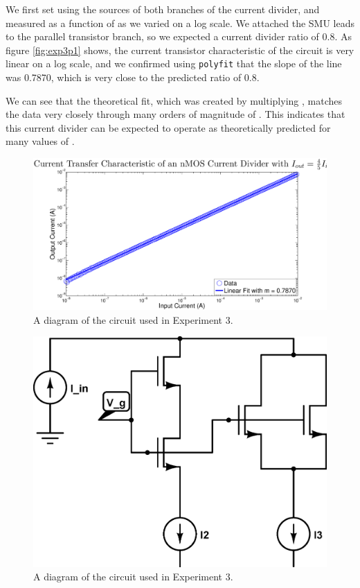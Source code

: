 We first set \Iin using the sources of both branches of the current divider, and measured \Iout as a function of \Iin as we varied \Iin on a log scale. We attached the SMU leads to the parallel transistor branch, so we expected a current divider ratio of 0.8. As figure \ref{fig:exp3p1} shows, the current transistor characteristic of the circuit is very linear on a log scale, and we confirmed using \texttt{polyfit} that the slope of the line was 0.7870, which is very close to the predicted ratio of 0.8.

We can see that the theoretical fit, which was created by multiplying , matches the data very closely through many orders of magnitude of \Iin. This indicates that this current divider can be expected to operate as theoretically predicted for many values of \Iin.

\begin{figure}[H]
\centering
\includegraphics[width=\linewidth]{../Figures/Experiment3Figure1.eps}
\caption{A diagram of the circuit used in Experiment 3.}
\label{fig:exp3p2}
\end{figure}

\begin{figure}[H]
\centering
\includegraphics[width=0.65\linewidth]{../Figures/Experiment3CircuitDiagram2.eps}
\caption{A diagram of the circuit used in Experiment 3.}
\label{fig:exp3p2dia}
\end{figure}


